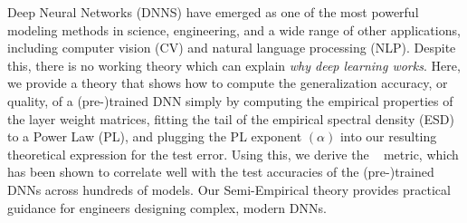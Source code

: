 Deep Neural Networks (DNNS) have emerged as one of the most powerful modeling methods in science, engineering, and a wide range of other applications, including computer vision (CV) and natural language processing (NLP).
Despite this, there is no working theory which can explain \emph{why deep learning works}.
Here, we provide a theory that shows how to compute the generalization accuracy, or quality, of a (pre-)trained DNN simply by computing the empirical properties of the layer weight matrices, fitting the tail of the empirical spectral density (ESD) to a Power Law (PL), and plugging the PL exponent $(\alpha)$ into our resulting theoretical expression for the test error.
Using this, we derive the \WW~ \ALPHAHAT metric, which has been shown to correlate well with the test accuracies of the (pre-)trained DNNs across hundreds of models.
Our Semi-Empirical theory provides practical guidance for engineers designing complex, modern DNNs.  




